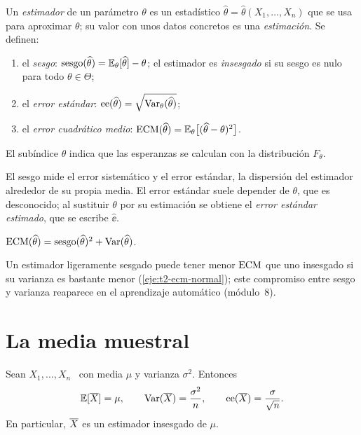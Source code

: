 \begin{definicion}\label{def:t2-estimador}
Un \emph{estimador} de un parámetro $\theta$ es un estadístico $\widehat\theta=\widehat\theta(X_1,\dots,X_n)$ que se usa para aproximar $\theta$; su valor con unos datos concretos es una \emph{estimación}. Se definen:
\begin{enumerate}
  \item el \emph{sesgo}: $\operatorname{sesgo}(\widehat\theta)=\mathbb{E}_\theta[\widehat\theta]-\theta$; el estimador es \emph{insesgado} si su sesgo es nulo para todo $\theta\in\Theta$;
  \item el \emph{error estándar}: $\operatorname{ee}(\widehat\theta)=\sqrt{\operatorname{Var}_\theta(\widehat\theta)}$;
  \item el \emph{error cuadrático medio}: $\operatorname{ECM}(\widehat\theta)=\mathbb{E}_\theta\bigl[(\widehat\theta-\theta)^{2}\bigr]$.
\end{enumerate}
El subíndice $\theta$ indica que las esperanzas se calculan con la distribución $F_\theta$.
\end{definicion}

El sesgo mide el error sistemático y el error estándar, la dispersión del estimador alrededor de su propia media. El error estándar suele depender de $\theta$, que es desconocido; al sustituir $\theta$ por su estimación se obtiene el \emph{error estándar estimado}, que se escribe $\widehat{\ee}$.

\begin{proposicion}\label{prop:t2-ecm}
$\operatorname{ECM}(\widehat\theta)=\operatorname{sesgo}(\widehat\theta)^{2}+\operatorname{Var}(\widehat\theta)$.
\end{proposicion}

Un estimador ligeramente sesgado puede tener menor $\operatorname{ECM}$ que uno insesgado si su varianza es bastante menor (\cref{eje:t2-ecm-normal}); este compromiso entre sesgo y varianza reaparece en el aprendizaje automático (módulo~8).

\section{La media muestral}

\begin{teorema}\label{teo:t2-media}
Sean $X_1,\dots,X_n$ \iid\ con media $\mu$ y varianza $\sigma^{2}$. Entonces
\[
\mathbb{E}[\overline{X}]=\mu,\qquad \operatorname{Var}(\overline{X})=\frac{\sigma^{2}}{n},\qquad \operatorname{ee}(\overline{X})=\frac{\sigma}{\sqrt n}.
\]
En particular, $\overline{X}$ es un estimador insesgado de $\mu$.
\end{teorema}

